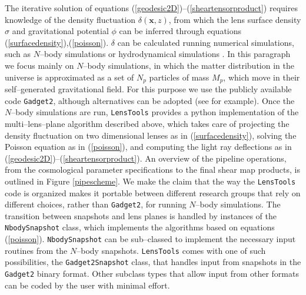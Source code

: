 \documentclass[5p]{elsarticle}
\newcommand{\bb}[1]{\mathbf{#1}}
\newcommand{\ttt}[1]{\texttt{#1}}
\newcommand{\LT}{\texttt{LensTools} }
\begin{document}
The iterative solution of equations (\ref{geodesic2D})--(\ref{sheartensorproduct}) requires knowledge of the density fluctuation $\delta(\bb{x},z)$, from which the lens surface density $\sigma$ and gravitational potential $\phi$ can be inferred through equations (\ref{surfacedensity}),(\ref{poisson}). $\delta$ can be calculated running numerical simulations, such as $N$--body simulations \citep{Gadget2,HACC} or hydrodynamical simulations \citep{Flash}. In this paragraph we focus mainly on $N$--body simulations, in which the matter distribution in the universe is approximated as a set of $N_p$ particles of mass $M_p$, which move in their self--generated gravitational field. For this purpose we use the publicly available code \ttt{Gadget2}\citep{Gadget2}, although alternatives can be adopted (see \citep{HACC} for example). Once the $N$--body simulations are run, \LT provides a {\sc python} implementation of the multi--lens--plane algorithm \citep{RayTracingHartlap} described above, which takes care of projecting the density fluctuation on two dimensional lenses as in (\ref{surfacedensity}), solving the Poisson equation as in (\ref{poisson}), and computing the light ray deflections as in (\ref{geodesic2D})--(\ref{sheartensorproduct}). An overview of the pipeline operations, from the cosmological parameter specifications to the final shear map products, is outlined in Figure \ref{pipescheme}. We make the claim that the way the \LT code is organized makes it portable between different research groups that rely on different choices, rather than \ttt{Gadget2}, for running $N$--body simulations. The transition between snapshots and lens planes is handled by instances of the \ttt{NbodySnapshot} class, which implements the algorithms based on equations (\ref{poisson}). \ttt{NbodySnapshot} can be sub--classed to implement the necessary input routines from the $N$--body snapshots. \LT comes with one of such possibilities, the \ttt{Gadget2Snapshot} class, that handles input from snapshots in the \ttt{Gadget2} binary format. Other subclass types that allow input from other formats can be coded by the user with minimal effort.  
\end{document}
